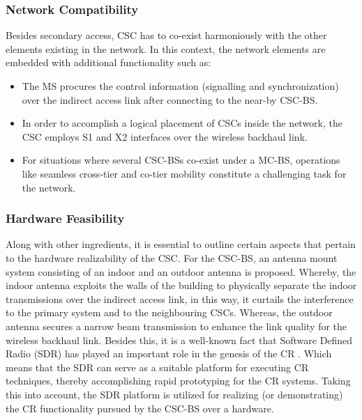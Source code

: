 \subsubsection*{Network Compatibility}
Besides secondary access, CSC has to co-exist harmoniously with the other elements existing in the network. In this context, the network elements are embedded with additional functionality such as:
\begin{itemize}
\item The MS procures the control information (signalling and synchronization) over the indirect access link after connecting to the near-by CSC-BS.
\item In order to accomplish a logical placement of CSCs inside the network, the CSC employs S1 and X2 interfaces over the wireless backhaul link.
\item For situations where several CSC-BSs co-exist under a MC-BS, operations like seamless cross-tier and co-tier mobility constitute a challenging task for the network.
\end{itemize}


\subsubsection*{Hardware Feasibility}
Along with other ingredients, it is essential to outline certain aspects that pertain to the hardware realizability of the CSC. For the CSC-BS, an antenna mount system consisting of an indoor and an outdoor antenna is proposed. Whereby, the indoor antenna exploits the walls of the building to physically separate the indoor transmissions over the indirect access link, in this way, it curtails the interference to the primary system and to the neighbouring CSCs. Whereas, the outdoor antenna secures a narrow beam transmission to enhance the link quality for the wireless backhaul link. Besides this, it is a well-known fact that Software Defined Radio (SDR) has played an important role in the genesis of the CR \cite{Jondral05}. Which means that the SDR can serve as a suitable platform for executing CR techniques, thereby accomplishing rapid prototyping for the CR systems. Taking this into account, the SDR platform is utilized for realizing (or demonstrating) the CR functionality pursued by the CSC-BS over a hardware.


